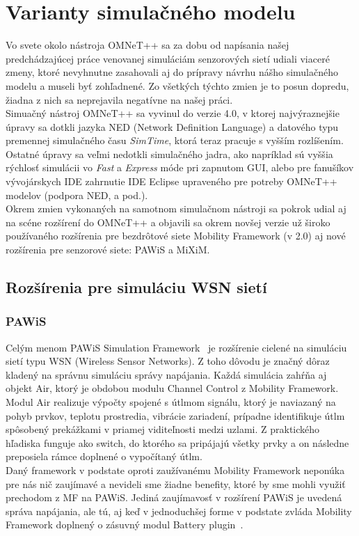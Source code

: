 \chapter{Varianty simulačného modelu}

\indent\indent Vo svete okolo nástroja OMNeT++ sa za dobu od napísania našej predchádzajúcej práce venovanej simuláciám senzorových sietí udiali viaceré zmeny, ktoré nevyhnutne zasahovali aj do prípravy návrhu nášho simulačného modelu a museli byť zohľadnené. Zo všetkých týchto zmien je to posun dopredu, žiadna z nich sa neprejavila negatívne na našej práci.\\
\indent Simuačný nástroj OMNeT++ sa vyvinul do verzie 4.0, v ktorej najvýraznejšie úpravy sa dotkli jazyka NED (Network Definition Language) a datového typu premennej simulačného času \textit{SimTime}, ktorá teraz pracuje s vyšším rozlíšením. Ostatné úpravy sa veľmi nedotkli simulačného jadra, ako napríklad sú vyššia rýchlosť simulácii vo \textit{Fast} a \textit{Express} móde pri zapnutom GUI, alebo pre fanušíkov vývojárskych IDE zahrnutie IDE Eclipse upraveného pre potreby OMNeT++ modelov (podpora NED, a pod.).\\
\indent Okrem zmien vykonaných na samotnom simulačnom nástroji sa pokrok udial aj na scéne rozšírení do OMNeT++ a objavili sa okrem novšej verzie už široko používaného rozšírenia pre bezdrôtové siete Mobility Framework (v 2.0) aj nové rozšírenia pre senzorové siete: PAWiS a MiXiM.\\

\section{Rozšírenia pre simuláciu WSN sietí}

\subsection{PAWiS}
\indent\indent Celým menom PAWiS Simulation Framework~\cite{pawis_homepage} je rozšírenie cielené na simuláciu sietí typu WSN (Wireless Sensor Networks). Z toho dôvodu je značný dôraz kladený na správnu simuláciu správy napájania. Každá simulácia zahŕňa aj objekt \ttfamily Air\rmfamily, ktorý je obdobou modulu \ttfamily Channel Control \rmfamily z Mobility Framework. Modul \ttfamily Air \rmfamily realizuje výpočty spojené s útlmom signálu, ktorý je naviazaný na pohyb prvkov, teplotu prostredia, vibrácie zariadení, prípadne identifikuje útlm spôsobený prekážkami v priamej viditeľnosti medzi uzlami. Z praktického hľadiska funguje ako switch, do ktorého sa pripájajú všetky prvky a on následne preposiela rámce doplnené o vypočítaný útlm.\\
\indent Daný framework v podstate oproti zaužívanému Mobility Framework neponúka pre nás nič zaujímavé a nevideli sme žiadne benefity, ktoré by sme mohli využiť prechodom z MF na PAWiS. Jediná zaujímavosť v rozšírení PAWiS je uvedená správa napájania, ale tú, aj keď v jednoduchšej forme v podstate zvláda Mobility Framework doplnený o zásuvný modul Battery plugin~\cite{forster_homepage}.\\

